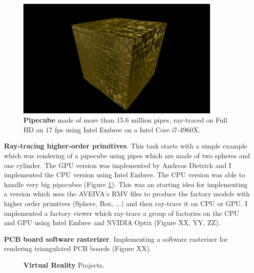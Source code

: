 \documentclass[]{report}
\begin{document}
\begin{figure}[!ht]
	\centering
	\includegraphics[width=0.90\textwidth]{./figs/pipecube.png}
	\caption[Pipecube]{\textbf{Pipecube} made of more than 15.6 million pipes, ray-traced on Full HD on 17 fps using Intel Embree on a Intel Core i7-4960X.}
	\label{fig:pipecube}
\end{figure}



\textbf{Ray-tracing higher-order primitives}. This task starts with a simple example which was rendering of a pipecube using pipes which are made of two spheres and one cylinder. The GPU version was implemented by Andreas Dietrich and I implemented the CPU version using Intel Embree. The CPU version was able to handle very big pipecubes (Figure \ref{fig:pipecube}). This was an starting idea for implementing a version which uses the AVEIVA's RMV files to produce the factory models with higher order primtives (Sphere, Box, ...) and then ray-trace it on CPU or GPU. I implemented a factory viewer which ray-trace a group of factories on the CPU and GPU using Intel Embree and NVIDIA Optix (Figure XX, YY, ZZ).

\textbf{PCB board software rasterizer}. Implementing a software rasterizer for rendering triangulated PCB boards (Figure XX).

\begin{figure}[!ht]
	\hfill
	\caption[Virtual Reality]{\textbf{Virtual Reality} Projects.}
	\label{fig:VR}
\end{figure}
\end{document}
